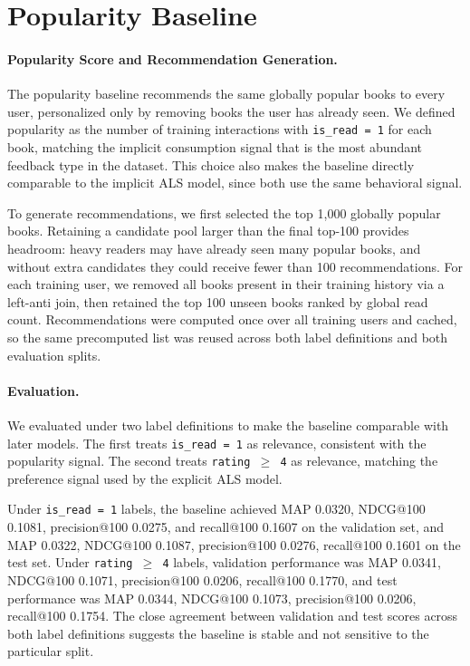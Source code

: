 \documentclass[10pt,twocolumn]{article}
\begin{document}
\section{Popularity Baseline}

\paragraph{Popularity Score and Recommendation Generation.} The popularity baseline recommends the same globally popular books to every user, personalized only by removing books the user has already seen. We defined popularity as the number of training interactions with \texttt{is\_read = 1} for each book, matching the implicit consumption signal that is the most abundant feedback type in the dataset. This choice also makes the baseline directly comparable to the implicit ALS model, since both use the same behavioral signal.

To generate recommendations, we first selected the top 1{,}000 globally popular books. Retaining a candidate pool larger than the final top-100 provides headroom: heavy readers may have already seen many popular books, and without extra candidates they could receive fewer than 100 recommendations. For each training user, we removed all books present in their training history via a left-anti join, then retained the top 100 unseen books ranked by global read count. Recommendations were computed once over all training users and cached, so the same precomputed list was reused across both label definitions and both evaluation splits.

\paragraph{Evaluation.} We evaluated under two label definitions to make the baseline comparable with later models. The first treats \texttt{is\_read = 1} as relevance, consistent with the popularity signal. The second treats \texttt{rating $\geq$ 4} as relevance, matching the preference signal used by the explicit ALS model.

Under \texttt{is\_read = 1} labels, the baseline achieved MAP 0.0320, NDCG@100 0.1081, precision@100 0.0275, and recall@100 0.1607 on the validation set, and MAP 0.0322, NDCG@100 0.1087, precision@100 0.0276, recall@100 0.1601 on the test set. Under \texttt{rating $\geq$ 4} labels, validation performance was MAP 0.0341, NDCG@100 0.1071, precision@100 0.0206, recall@100 0.1770, and test performance was MAP 0.0344, NDCG@100 0.1073, precision@100 0.0206, recall@100 0.1754. The close agreement between validation and test scores across both label definitions suggests the baseline is stable and not sensitive to the particular split.
\end{document}
